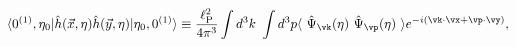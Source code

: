 \begin{equation}
\langle 0^{(1)},\eta_0| \hat{h}(\vec{x},\eta) \hat{h}(\vec{y},\eta) | \eta_{0},0^{(1)}\rangle \equiv 
\frac{ \ell_{\rm P}^2}{4\pi^3} \int d^3 k~\int d^3 p 
\langle ~\hat{\Psi}_{\vk}(\eta)~ \hat{\Psi}_{\vp}(\eta)~ \rangle e^{ - i (\vk\cdot\vx + \vp\cdot\vy)},
\label{twopo1}
\end{equation}

